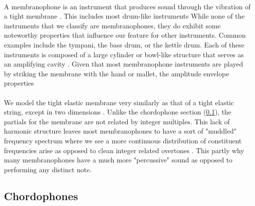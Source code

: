 \documentclass[12pt,letterpaper]{article}
\begin{document}
\paragraph*{}A membranophone is an instrument that produces sound through the vibration of a tight membrane \cite{Hornbostel}. This includes most drum-like instruments While none of the instruments that we classify are membranophones, they do exhibit some noteworthy properties that influence our feature for other instruments. Common examples include the tympani, the bass drum, or the kettle drum. Each of these instruments is composed of a large cylinder or bowl-like structure that serves as an amplifying cavity \cite{Olson,White}. Given that most membranophone instruments are played by striking the membrane with the hand or mallet, the amplitude envelope properties 

\paragraph*{}We model the tight elastic membrane very similarly as that of a tight elastic string, except in two dimensions \cite{White}. Unlike the chordophone section (\ref{subsec-chordophones}), the partials for the membrane are not related by integer multiples. This lack of harmonic structure leaves most membranophones to have a sort of "muddled" frequency spectrum where we see a more continuous distribution of constituent frequencies arise as opposed to clean integer related overtones \cite{White,Olson}. This partly why many membranophones have a much more "percussive" sound as opposed to performing any distinct note.


\subsection{Chordophones}
\label{subsec-chordophones}
\end{document}
